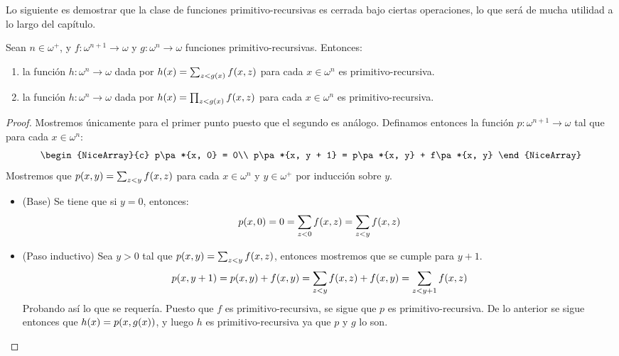 Lo siguiente es demostrar que la clase de funciones primitivo-recursivas es cerrada bajo ciertas operaciones, lo que será de mucha utilidad a lo largo del capítulo.

\begin{theorem}
	Sean $n\in\omega^{+}$, y $f:\omega^{n + 1}\to\omega$ y $g:\omega^{n}\to\omega$ funciones primitivo-recursivas. Entonces:

	\begin{enumerate}
		\item la función $h:\omega^{n}\to\omega$ dada por $h\pa*{x} =\sum_{z < g\pa*{x}}f\pa*{x, z}$ para cada $x\in\omega^{n}$ es primitivo-recursiva.
		\item la función $h:\omega^{n}\to\omega$ dada por $h\pa*{x} =\prod_{z < g\pa*{x}}f\pa*{x, z}$ para cada $x\in\omega^{n}$ es primitivo-recursiva.
	\end{enumerate}
\end{theorem}

\begin{proof}
	Mostremos únicamente para el primer punto puesto que el segundo es análogo. Definamos entonces la función $p:\omega^{n + 1}\to\omega$ tal que para cada $x\in\omega^{n}$:
	\[
		\begin{NiceArray}{c}
			p\pa*{x, 0} = 0\\
			p\pa*{x, y + 1} = p\pa*{x, y} + f\pa*{x, y}
		\end{NiceArray}
	\]
	Mostremos que $p\pa*{x, y} =\sum_{z < y}f\pa*{x, z}$ para cada $x\in\omega^{n}$ y $y\in\omega^{+}$ por inducción sobre $y$.

	\begin{itemize}
		\item (Base) Se tiene que si $y = 0$, entonces:
		\[
			p\pa*{x, 0} = 0 =\sum_{z < 0}f\pa*{x, z} =\sum_{z < y}f\pa*{x, z}
		\]
		\item (Paso inductivo) Sea $y > 0$ tal que $p\pa*{x, y} =\sum_{z < y}f\pa*{x, z}$, entonces mostremos que se cumple para $y + 1$.
		\[
			p\pa*{x, y + 1} = p\pa*{x, y} + f\pa*{x, y} =\sum_{z < y}f\pa*{x, z} + f\pa*{x, y} =\sum_{z < y + 1}f\pa*{x, z}
		\]
		Probando así lo que se requería. Puesto que $f$ es primitivo-recursiva, se sigue que $p$ es primitivo-recursiva. De lo anterior se sigue entonces que $h\pa*{x} = p\pa*{x, g\pa*{x}}$, y luego $h$ es primitivo-recursiva ya que $p$ y $g$ lo son.
	\end{itemize}
\end{proof}


